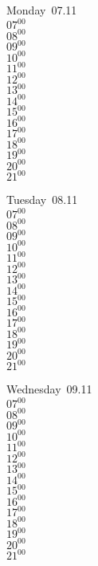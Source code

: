 \documentclass[11pt,a4paper]{book}\usepackage[]{graphicx}\usepackage[]{color}
\begin{document}
\begin{headerbox}
\end{headerbox}
\begin{weekdaybox}
  Monday~07.11\\
  { 
  \vfill
  $07^{00}$\\
$08^{00}$\\
$09^{00}$\\
$10^{00}$\\
$11^{00}$\\
$12^{00}$\\
$13^{00}$\\
$14^{00}$\\
$15^{00}$\\
$16^{00}$\\
$17^{00}$\\
$18^{00}$\\
$19^{00}$\\
$20^{00}$\\
$21^{00}$\\
  }
\end{weekdaybox}
\begin{weekdaybox}
  Tuesday~08.11\\
  { 
  \vfill
  $07^{00}$\\
$08^{00}$\\
$09^{00}$\\
$10^{00}$\\
$11^{00}$\\
$12^{00}$\\
$13^{00}$\\
$14^{00}$\\
$15^{00}$\\
$16^{00}$\\
$17^{00}$\\
$18^{00}$\\
$19^{00}$\\
$20^{00}$\\
$21^{00}$\\
  }
\end{weekdaybox}
\begin{weekdaybox}
  Wednesday~09.11\\
  { 
  \vfill
  $07^{00}$\\
$08^{00}$\\
$09^{00}$\\
$10^{00}$\\
$11^{00}$\\
$12^{00}$\\
$13^{00}$\\
$14^{00}$\\
$15^{00}$\\
$16^{00}$\\
$17^{00}$\\
$18^{00}$\\
$19^{00}$\\
$20^{00}$\\
$21^{00}$\\
  }
\end{weekdaybox}
\end{document}
